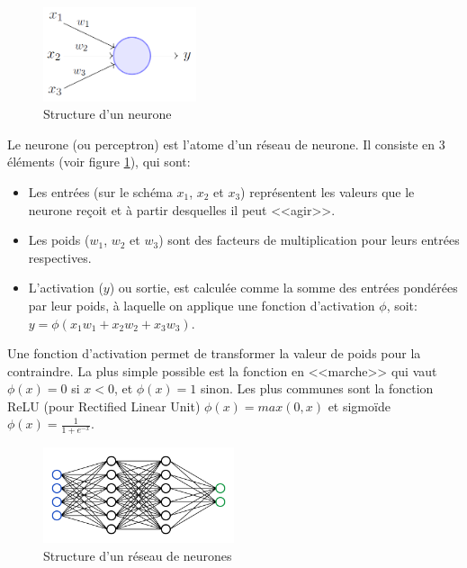 \documentclass[openany, 11pt]{memoir}
\begin{document}
\begin{figure}[ht]
	\centering
	\includegraphics[width=0.4\textwidth]{images/neurone.png}
	\caption{Structure d'un neurone}
	\label{neurone}
\end{figure}

\bigskip
Le neurone (ou perceptron) est l'atome d'un réseau de neurone. Il consiste en 3 éléments (voir figure \ref{neurone}), qui sont:

\begin{itemize}
	\item Les entrées (sur le schéma $x_1$, $x_2$ et $x_3$) représentent les valeurs que le neurone reçoit et à partir desquelles il peut <<agir>>.
	\item Les poids ($w_1$, $w_2$ et $w_3$) sont des facteurs de multiplication pour leurs entrées respectives.
	\item L'activation ($y$) ou sortie, est calculée comme la somme des entrées pondérées par leur poids, à laquelle on applique une fonction d'activation $\phi$, soit: $y = \phi(x_1 w_1 + x_2 w_2 + x_3 w_3)$.
\end{itemize}

Une fonction d'activation permet de transformer la valeur de poids pour la contraindre. La plus simple possible est la fonction en <<marche>> qui vaut $\phi(x) = 0$ si $x < 0$, et $\phi(x) = 1$ sinon. Les plus communes sont la fonction ReLU (pour Rectified Linear Unit) $\phi(x) = max(0, x)$ et sigmoïde $\phi(x) = \frac{1}{1 + e^{-x}}$.

\begin{figure}[ht]
	\centering
	\includegraphics[width=0.5\textwidth]{images/reseau.png}
	\caption{Structure d'un réseau de neurones}
	\label{reseau}
\end{figure}
\end{document}
